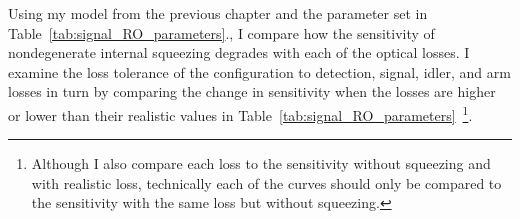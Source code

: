 Using my model from the previous chapter and the parameter set in Table~\ref{tab:signal_RO_parameters}., I compare how the sensitivity of nondegenerate internal squeezing degrades with each of the optical losses. %
I examine the loss tolerance of the configuration to detection, signal, idler, and arm losses in turn by comparing the change in sensitivity when the losses are higher or lower than their realistic values in Table~\ref{tab:signal_RO_parameters}~\footnote{Although I also compare each loss to the sensitivity without squeezing and with realistic loss, technically each of the curves should only be compared to the sensitivity with the same loss but without squeezing.}. %

